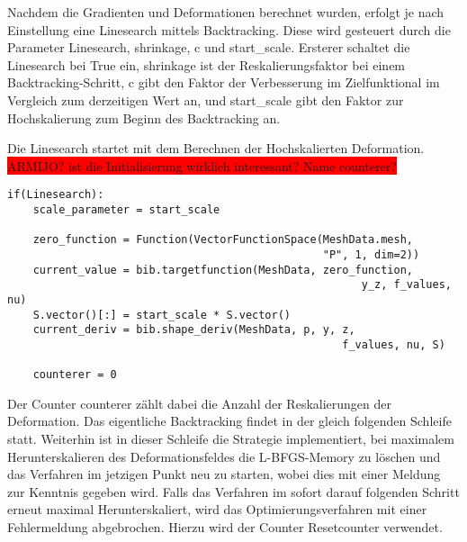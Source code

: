 \documentclass[bibliography=totoc,12pt,a4paper]{scrartcl}
\theoremstyle{exampstyle}
\numberwithin{equation}{section}
\begin{document}
\label{backtracking}
Nachdem die Gradienten und Deformationen berechnet wurden, erfolgt je nach Einstellung eine Linesearch mittels Backtracking. Diese wird gesteuert durch die Parameter \textsf{Linesearch}, \textsf{shrinkage}, \textsf{c} und \textsf{start\_scale}. Ersterer schaltet die Linesearch bei \textsf{True} ein, \textsf{shrinkage} ist der Reskalierungsfaktor bei einem Backtracking-Schritt, \textsf{c} gibt den Faktor der Verbesserung im Zielfunktional im Vergleich zum derzeitigen Wert an, und \textsf{start\_scale} gibt den Faktor zur Hochskalierung zum Beginn des Backtracking an.

Die Linesearch startet mit dem Berechnen der Hochskalierten Deformation.
\colorbox{red}{ARMIJO? ist die Initialisierung wirklich interessant? Name counterer?}
\begin{lstlisting}
if(Linesearch):
	scale_parameter = start_scale

    zero_function = Function(VectorFunctionSpace(MeshData.mesh,
                                                 "P", 1, dim=2))
    current_value = bib.targetfunction(MeshData, zero_function,
        								               y_z, f_values, nu)
    S.vector()[:] = start_scale * S.vector()
    current_deriv = bib.shape_deriv(MeshData, p, y, z, 
    								                f_values, nu, S)

    counterer = 0
\end{lstlisting}
Der Counter \textsf{counterer} zählt dabei die Anzahl der Reskalierungen der Deformation. Das eigentliche Backtracking findet in der gleich folgenden Schleife statt. Weiterhin ist in dieser Schleife die Strategie implementiert, bei maximalem Herunterskalieren des Deformationsfeldes die L-BFGS-Memory zu löschen und das Verfahren im jetzigen Punkt neu zu starten, wobei dies mit einer Meldung zur Kenntnis gegeben wird. Falls das Verfahren im sofort darauf folgenden Schritt erneut maximal Herunterskaliert, wird das Optimierungsverfahren mit einer Fehlermeldung abgebrochen. Hierzu wird der Counter \textsf{Resetcounter} verwendet.
\newpage
\end{document}
